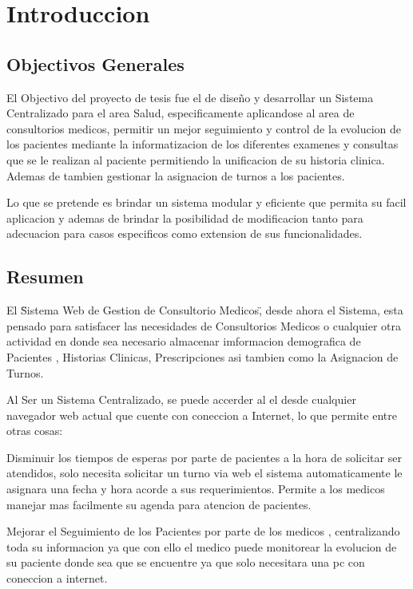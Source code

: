 \chapter{Introduccion}

\section{Objectivos Generales}


El Objectivo del proyecto de tesis fue el de diseño y desarrollar un Sistema
Centralizado para el area Salud, especificamente aplicandose al area de
consultorios medicos, permitir un mejor seguimiento y control de la evolucion
de los pacientes mediante la informatizacion de los diferentes examenes y consultas
que se le realizan al paciente permitiendo la unificacion de su historia clinica.
Ademas de tambien gestionar la asignacion de turnos a los pacientes.

Lo que se pretende es brindar un sistema modular y eficiente que permita su
facil aplicacion y ademas de brindar la posibilidad de modificacion tanto para
adecuacion para casos especificos como extension de sus funcionalidades.

\section{Resumen}

El \"Sistema Web de Gestion de Consultorio Medicos\", desde ahora el Sistema,
esta pensado para satisfacer las necesidades de Consultorios Medicos o cualquier
otra actividad en donde sea necesario almacenar imformacion demografica de Pacientes
, Historias Clinicas, Prescripciones asi tambien como la Asignacion de Turnos.

Al Ser un Sistema Centralizado, se puede accerder al el desde cualquier navegador
web actual que cuente con coneccion a Internet, lo que permite entre otras cosas:

Disminuir los tiempos de esperas por parte de pacientes a la hora de solicitar ser
atendidos, solo necesita solicitar un turno via web el sistema automaticamente
le asignara una fecha y hora acorde a sus requerimientos. Permite a los medicos
manejar mas facilmente su agenda para atencion de pacientes.

Mejorar el Seguimiento de los Pacientes por parte de los medicos , centralizando
toda su informacion ya que con ello el medico puede monitorear la evolucion de
su paciente donde sea que se encuentre ya que solo necesitara una pc con coneccion
a internet.







